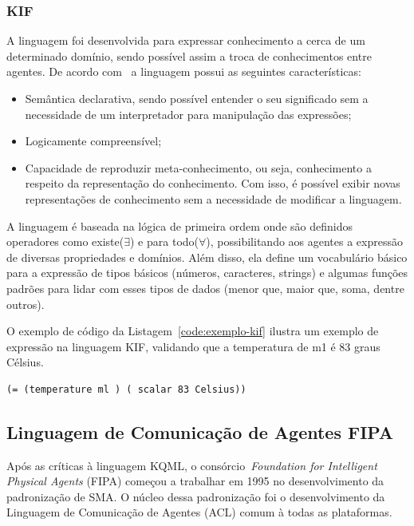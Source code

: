 \subsubsection{KIF}
A linguagem foi desenvolvida para expressar conhecimento a cerca de um determinado domínio, sendo possível assim a troca de conhecimentos entre agentes. De acordo com~\cite{kifmanual} a linguagem possui as seguintes características:
\begin{itemize}
	\item Semântica declarativa, sendo possível entender o seu significado sem a necessidade de um interpretador para manipulação das expressões;
	\item Logicamente compreensível;
	\item Capacidade de reproduzir meta-conhecimento, ou seja, conhecimento a respeito da representação do conhecimento. Com isso, é possível exibir novas representações de conhecimento sem a necessidade de modificar a linguagem.
\end{itemize}

A linguagem é baseada na lógica de primeira ordem onde são definidos operadores como existe($\exists$) e para todo($\forall$), possibilitando aos agentes a expressão de diversas propriedades e domínios. Além disso, ela define um vocabulário básico para a expressão de tipos básicos (números, caracteres, strings) e algumas funções padrões para lidar com esses tipos de dados (menor que, maior que, soma, dentre outros). 

O exemplo de código da Listagem~\ref{code:exemplo-kif} ilustra um exemplo de expressão na linguagem KIF, validando que a temperatura de m1 é 83 graus Célsius.

\begin{lstlisting}[label=code:exemplo-kif,caption=Exemplo de expressão de conteúdo com a linguagem KIF. Fonte:~\cite{wooldridge04}]
(= (temperature ml ) ( scalar 83 Celsius))
\end{lstlisting}

\subsection{Linguagem de Comunicação de Agentes FIPA}

Após as críticas à linguagem KQML, o consórcio~\emph{Foundation for Intelligent Physical Agents} (FIPA) começou a trabalhar em 1995 no desenvolvimento da padronização de SMA. O núcleo dessa padronização foi o desenvolvimento da Linguagem de Comunicação de Agentes (ACL) comum à todas as plataformas.

